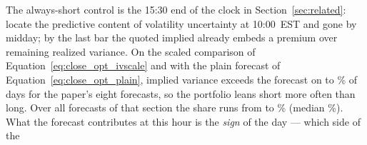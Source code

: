 \ifdefined\cmNdays\else\fi
The always-short control is the 15:30 end of the clock in
Section~\ref{sec:related}: \citet{HizmeriBevilacqua2025} locate the
predictive content of volatility uncertainty at 10:00~EST and gone by
midday; by the last bar the quoted implied already embeds a premium
over remaining realized variance.
On the scaled comparison of Equation~\eqref{eq:close_opt_ivscale} and with the
plain forecast of Equation~\eqref{eq:close_opt_plain}, implied variance exceeds
the forecast on \cmSellPaperMin{} to %
\cmSellPaperMax\% of days for the paper's eight forecasts, so the portfolio leans short
more often than long.
Over all \cmMasterN{} forecasts of that section the share runs from %
\cmSellMasterMin{} to \cmSellMasterMax\% (median \cmSellMasterMed\%). What the forecast
contributes at this hour is the \emph{sign} of the day --- which side of the
